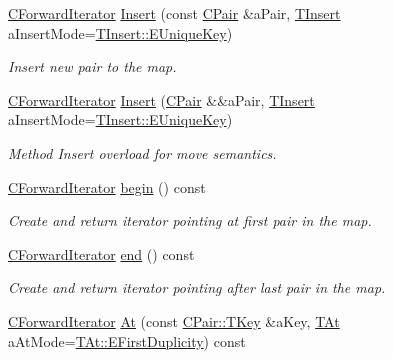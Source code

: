 \begin{DoxyCompactItemize}
\hyperlink{class_c_hash_map_1_1_c_forward_iterator}{C\+Forward\+Iterator} \hyperlink{class_c_hash_map_a443526f71277f329e9e77522c31f1350}{Insert} (const \hyperlink{class_c_pair}{C\+Pair} \&a\+Pair, \hyperlink{class_c_hash_map_ad4dd353df970a4464c449ef9f3b6a172}{T\+Insert} a\+Insert\+Mode=\hyperlink{class_c_hash_map_ad4dd353df970a4464c449ef9f3b6a172a9823330641aba5e354b5ec054e03925d}{T\+Insert\+::\+E\+Unique\+Key})
\begin{DoxyCompactList}\small\item\em Insert new pair to the map. \end{DoxyCompactList}\item 
\hyperlink{class_c_hash_map_1_1_c_forward_iterator}{C\+Forward\+Iterator} \hyperlink{class_c_hash_map_a0b9e79b3655b63c1f9a6d40715ad29fb}{Insert} (\hyperlink{class_c_pair}{C\+Pair} \&\&a\+Pair, \hyperlink{class_c_hash_map_ad4dd353df970a4464c449ef9f3b6a172}{T\+Insert} a\+Insert\+Mode=\hyperlink{class_c_hash_map_ad4dd353df970a4464c449ef9f3b6a172a9823330641aba5e354b5ec054e03925d}{T\+Insert\+::\+E\+Unique\+Key})
\begin{DoxyCompactList}\small\item\em Method Insert overload for move semantics. \end{DoxyCompactList}\item 
\hyperlink{class_c_hash_map_1_1_c_forward_iterator}{C\+Forward\+Iterator} \hyperlink{class_c_hash_map_ab7d482a398a96039875771b26624afdf}{begin} () const
\begin{DoxyCompactList}\small\item\em Create and return iterator pointing at first pair in the map. \end{DoxyCompactList}\item 
\hyperlink{class_c_hash_map_1_1_c_forward_iterator}{C\+Forward\+Iterator} \hyperlink{class_c_hash_map_a3129d3b5595237ab172fe060c072c376}{end} () const
\begin{DoxyCompactList}\small\item\em Create and return iterator pointing after last pair in the map. \end{DoxyCompactList}\item 
\hyperlink{class_c_hash_map_1_1_c_forward_iterator}{C\+Forward\+Iterator} \hyperlink{class_c_hash_map_a0819ba29ac861e3d948d94b12e315127}{At} (const \hyperlink{class_c_pair_a9030f3ef2a07301c105bdf17620ae66a}{C\+Pair\+::\+T\+Key} \&a\+Key, \hyperlink{class_c_hash_map_a9c8b9ae56d510ae0ff5e9ba74ee9930d}{T\+At} a\+At\+Mode=\hyperlink{class_c_hash_map_a9c8b9ae56d510ae0ff5e9ba74ee9930da583fa6e6852d051c6e7f4b63cad9991f}{T\+At\+::\+E\+First\+Duplicity}) const

\end{DoxyCompactItemize}

